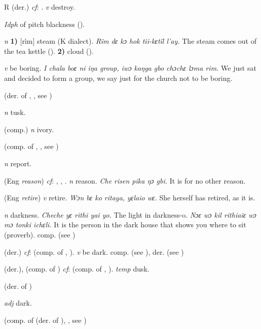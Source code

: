 \begin{letter}{R}
 (der.) \textit{cf}: . \textit{v} destroy.

 \textit{Idph} of pitch blackness (\citealt{Pichl1967}).

 \textit{n} \textbf{1)} [rìm] steam (K dialect). \textit{Rïm dɛ kɔ hok tii-kɛtïl l'ay.} The steam comes out of the tea kettle (\citealt{Pichl1967}). \textbf{2)} cloud (\citealt{Pichl1967}). 

 \textit{v} be boring. \textit{I chala boɛ ni iŋa group, iwɔ kaŋga gbo chɔchɛ lɔma rim.} We just sat and decided to form a group, we say just for the church not to be boring.

 (der. of , , see ) 

 \textit{n} tusk.

 (comp.) \textit{n} ivory.

 (comp. of , , see ) 

 \textit{n} report.

 (Eng \textit{reason}) \textit{cf}: , , . \textit{n} reason. \textit{Che risen pika ŋɔ gbi.} It is for no other reason.

 (Eng \textit{retire}) \textit{v} retire. \textit{Wɔn bɛ ko ritaya, yɛlaio wɛ.} She herself has retired, as it is.

 \textit{n} darkness. \textit{Cheche yɛ rithi yai yo.} The light in darkness-o.\textit{ Nɔɛ wɔ kil rithiaiɛ wɔ mɔ tonki ichɛli.} It is the person in the dark house that shows you where to sit (proverb). comp.  (see ) 

 (der.) \textit{cf}:  (comp. of , ). \textit{v} be dark. comp.  (see ), der.  (see )

 (der.), (comp. of ) \textit{cf}:  (comp. of , ). \textit{temp} dusk. 

 (der. of ) 

 \textit{adj} dark.

 (comp. of  (der. of ), , see ) 


\end{letter}

